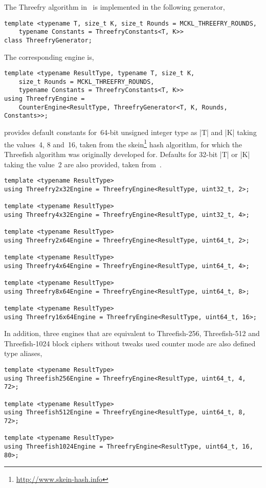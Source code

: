 The Threefry algorithm in~\cite{Salmon:2011um} is implemented in the following
generator,
\begin{verbatim}
template <typename T, size_t K, size_t Rounds = MCKL_THREEFRY_ROUNDS,
    typename Constants = ThreefryConstants<T, K>>
class ThreefryGenerator;
\end{verbatim}
The corresponding \rng engine is,
\begin{verbatim}
template <typename ResultType, typename T, size_t K,
    size_t Rounds = MCKL_THREEFRY_ROUNDS,
    typename Constants = ThreefryConstants<T, K>>
using ThreefryEngine =
    CounterEngine<ResultType, ThreefryGenerator<T, K, Rounds, Constants>>;
\end{verbatim}
\mckl provides default constants for~64-bit unsigned integer type as |T| and
|K| taking the values~4, 8 and~16, taken from the
skein\footnote{\url{http://www.skein-hash.info}} hash algorithm, for which the
Threefish algorithm was originally developed for. Defaults for 32-bit |T| or
|K| taking the value~2 are also provided, taken from~\cite{Salmon:2011um}.
\begin{verbatim}
template <typename ResultType>
using Threefry2x32Engine = ThreefryEngine<ResultType, uint32_t, 2>;

template <typename ResultType>
using Threefry4x32Engine = ThreefryEngine<ResultType, uint32_t, 4>;

template <typename ResultType>
using Threefry2x64Engine = ThreefryEngine<ResultType, uint64_t, 2>;

template <typename ResultType>
using Threefry4x64Engine = ThreefryEngine<ResultType, uint64_t, 4>;

template <typename ResultType>
using Threefry8x64Engine = ThreefryEngine<ResultType, uint64_t, 8>;

template <typename ResultType>
using Threefry16x64Engine = ThreefryEngine<ResultType, uint64_t, 16>;
\end{verbatim}
In addition, three engines that are equivalent to Threefish-256, Threefish-512
and Threefish-1024 block ciphers without tweaks used counter mode are also
defined type aliases,
\begin{verbatim}
template <typename ResultType>
using Threefish256Engine = ThreefryEngine<ResultType, uint64_t, 4, 72>;

template <typename ResultType>
using Threefish512Engine = ThreefryEngine<ResultType, uint64_t, 8, 72>;

template <typename ResultType>
using Threefish1024Engine = ThreefryEngine<ResultType, uint64_t, 16, 80>;
\end{verbatim}

